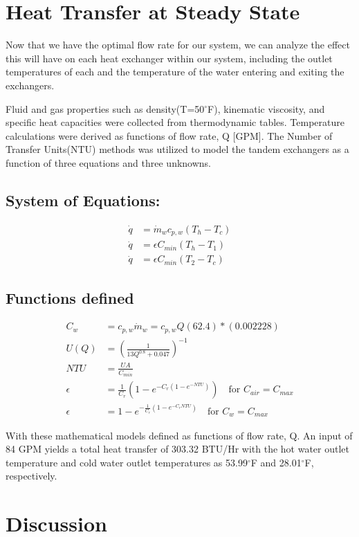 \documentclass{article}
\begin{document}
\section{Heat Transfer at Steady State}
Now that we have the optimal flow rate for our system, we can analyze the effect this will have on each heat exchanger within our system, including the outlet temperatures of each and the temperature of the water entering and exiting the exchangers. 

Fluid and gas properties such as density(T=50$^{\circ}$F), kinematic viscosity, and specific heat capacities were collected from thermodynamic tables. Temperature calculations were derived as functions of flow rate, Q [GPM]. The Number of Transfer Units(NTU) methods was utilized to model the tandem exchangers as a function of three equations and three unknowns. 

\subsection{System of Equations:}
\begin{align*}
\dot{q} &= \dot{m}_w c_{p,w} (T_h - T_c) \\
\dot{q} &= \epsilon C_{min} (T_h - T_1) \\
\dot{q} &= \epsilon C_{min} (T_2 - T_c)
\end{align*}

\subsection{Functions defined}
\begin{align*}
C_w &= c_{p,w} \dot{m}_w = c_{p,w} Q (62.4)*(0.002228) \\
U(Q) &= \left(\frac{1}{13Q^{0.8} + 0.047}\right)^{-1} \\
NTU &= \frac{UA}{C_{min}} \\
\epsilon &= \frac{1}{C_r}\left(1 - e^{-C_r(1-e^{-NTU})}\right) \quad \text{for } C_{air} = C_{max} \\
\epsilon &= 1 - e^{-\frac{1}{C_r}(1-e^{-C_r NTU})} \quad \text{for } C_w = C_{max}
\end{align*}

With these mathematical models defined as functions of flow rate, Q. An input of 84 GPM yields a total heat transfer of 303.32 BTU/Hr with the hot water outlet temperature and cold water outlet temperatures as 53.99$^{\circ}$F and 28.01$^{\circ}$F, respectively. 

\section{Discussion}
\end{document}
